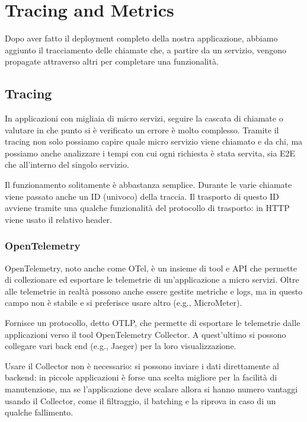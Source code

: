 \chapter{Tracing and Metrics}
Dopo aver fatto il deployment completo della nostra applicazione, abbiamo aggiunto il tracciamento delle chiamate che, a partire da un servizio, vengono propagate attraverso altri per completare una funzionalità.

\section{Tracing}
In applicazioni con migliaia di micro servizi, seguire la cascata di chiamate o valutare in che punto si è verificato un errore è molto complesso. Tramite il tracing non solo possiamo capire quale micro servizio viene chiamato e da chi, ma possiamo anche analizzare i tempi con cui ogni richiesta è stata servita, sia E2E che all'interno del singolo servizio.

\myskip

Il funzionamento solitamente è abbastanza semplice. Durante le varie chiamate viene passato anche un ID (univoco) della traccia. Il trasporto di questo ID avviene tramite una qualche funzionalità del protocollo di trasporto: in HTTP viene usato il relativo header.

\subsection{OpenTelemetry}
OpenTelemetry, noto anche come OTel, è un insieme di tool e API che permette di collezionare ed esportare le telemetrie di un'applicazione a micro servizi. Oltre alle telemetrie in realtà possono anche essere gestite metriche e logs, ma in questo campo non è stabile e si preferisce usare altro (e.g., MicroMeter).

\myskip

Fornisce un protocollo, detto OTLP, che permette di esportare le telemetrie dalle applicazioni verso il tool OpenTelemetry Collector. A quest'ultimo si possono collegare vari back end (e.g., Jaeger) per la loro visualizzazione.

Usare il Collector non è necessario: si possono inviare i dati direttamente al backend: in piccole applicazioni è forse una scelta migliore per la facilità di manutenzione, ma se l'applicazione deve scalare allora si hanno numero vantaggi usando il Collector, come il filtraggio, il batching e la riprova in caso di un qualche fallimento.

